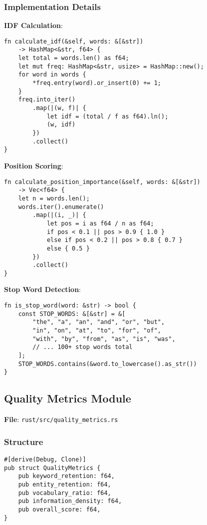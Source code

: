 \subsubsection{Implementation Details}

\textbf{IDF Calculation}:
\begin{verbatim}
fn calculate_idf(&self, words: &[&str]) 
    -> HashMap<&str, f64> {
    let total = words.len() as f64;
    let mut freq: HashMap<&str, usize> = HashMap::new();
    for word in words {
        *freq.entry(word).or_insert(0) += 1;
    }
    freq.into_iter()
        .map(|(w, f)| {
            let idf = (total / f as f64).ln();
            (w, idf)
        })
        .collect()
}
\end{verbatim}

\textbf{Position Scoring}:
\begin{verbatim}
fn calculate_position_importance(&self, words: &[&str]) 
    -> Vec<f64> {
    let n = words.len();
    words.iter().enumerate()
        .map(|(i, _)| {
            let pos = i as f64 / n as f64;
            if pos < 0.1 || pos > 0.9 { 1.0 }
            else if pos < 0.2 || pos > 0.8 { 0.7 }
            else { 0.5 }
        })
        .collect()
}
\end{verbatim}

\textbf{Stop Word Detection}:
\begin{verbatim}
fn is_stop_word(word: &str) -> bool {
    const STOP_WORDS: &[&str] = &[
        "the", "a", "an", "and", "or", "but",
        "in", "on", "at", "to", "for", "of",
        "with", "by", "from", "as", "is", "was",
        // ... 100+ stop words total
    ];
    STOP_WORDS.contains(&word.to_lowercase().as_str())
}
\end{verbatim}

\subsection{Quality Metrics Module}

\textbf{File}: \texttt{rust/src/quality\_metrics.rs}

\subsubsection{Structure}

\begin{verbatim}
#[derive(Debug, Clone)]
pub struct QualityMetrics {
    pub keyword_retention: f64,
    pub entity_retention: f64,
    pub vocabulary_ratio: f64,
    pub information_density: f64,
    pub overall_score: f64,
}
\end{verbatim}

